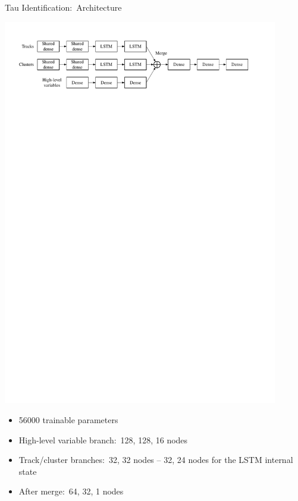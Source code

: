 \documentclass[11pt, xcolor={dvipsnames}, aspectratio=169]{beamer}
\begin{document}
\begin{frame}{Tau Identification:\ Architecture}
  \begin{center}
    \includegraphics[width=0.9\textwidth]{tauid/pubnote/rnn_network_architecture}
  \end{center}

  \begin{itemize}
    \setlength{\itemsep}{0.5em}

  \item \num{56000} trainable parameters

  \item High-level variable branch:\ 128, 128, 16 nodes

  \item Track/cluster branches:\ 32, 32 nodes -- 32, 24 nodes for the LSTM
    internal state

  \item After merge:\ 64, 32, 1 nodes

  \end{itemize}
\end{frame}
\end{document}
